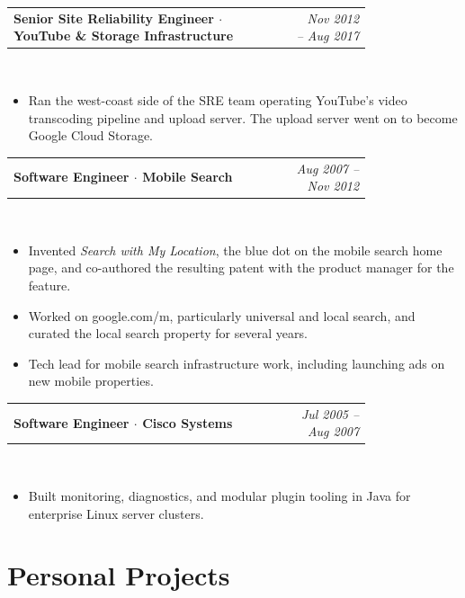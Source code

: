 \documentclass[10.5pt]{article}
\makeatletter
\newcommand{\role}[2]{%
  \noindent\begin{tabular*}{\linewidth}{@{}p{0.79\linewidth}@{\extracolsep{\fill}}r@{}}
  \textbf{#1} & \textit{#2}
  \end{tabular*}\\[0.5pt]
}
\makeatother
\begin{document}
\vspace{2pt}
\role{Senior Site Reliability Engineer $\cdot$ YouTube \& Storage Infrastructure}{Nov 2012 -- Aug 2017}
\begin{itemize}
  \item Ran the west-coast side of the SRE team operating YouTube's video transcoding pipeline and upload server. The upload server went on to become Google Cloud Storage.
\end{itemize}

\vspace{2pt}
\role{Software Engineer $\cdot$ Mobile Search}{Aug 2007 -- Nov 2012}
\begin{itemize}
  \item Invented \emph{Search with My Location}, the blue dot on the mobile search home page, and co-authored the resulting patent with the product manager for the feature.
  \item Worked on google.com/m, particularly universal and local search, and curated the local search property for several years.
  \item Tech lead for mobile search infrastructure work, including launching ads on new mobile properties.
\end{itemize}

\vspace{4pt}
\role{Software Engineer $\cdot$ Cisco Systems}{Jul 2005 -- Aug 2007}
\begin{itemize}
  \item Built monitoring, diagnostics, and modular plugin tooling in Java for enterprise Linux server clusters.
\end{itemize}

\section*{Personal Projects}
\end{document}

